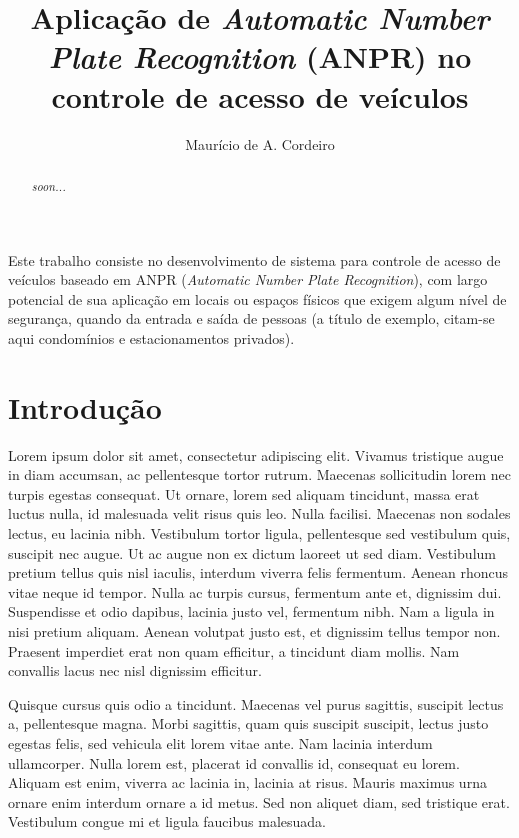 \documentclass[12pt]{article}
\title{Aplicação de \textit{Automatic Number Plate Recognition} (ANPR) no controle de acesso de veículos}
\author{Maurício de A. Cordeiro\inst{1} }
\begin{document}
 

\maketitle

\begin{abstract}
  \textit{soon...}
\end{abstract}
     
\begin{resumo} 
 Este trabalho consiste no desenvolvimento de sistema para controle de acesso de veículos baseado em ANPR (\textit{Automatic Number Plate Recognition}), com largo potencial de sua aplicação em locais ou espaços físicos que exigem algum nível de segurança, quando da entrada e saída de pessoas (a título de exemplo, citam-se aqui condomínios e estacionamentos privados). 
\end{resumo}

\section{Introdução}


Lorem ipsum dolor sit amet, consectetur adipiscing elit. Vivamus tristique augue in diam accumsan, ac pellentesque tortor rutrum. Maecenas sollicitudin lorem nec turpis egestas consequat. Ut ornare, lorem sed aliquam tincidunt, massa erat luctus nulla, id malesuada velit risus quis leo. Nulla facilisi. Maecenas non sodales lectus, eu lacinia nibh. Vestibulum tortor ligula, pellentesque sed vestibulum quis, suscipit nec augue. Ut ac augue non ex dictum laoreet ut sed diam. Vestibulum pretium tellus quis nisl iaculis, interdum viverra felis fermentum. Aenean rhoncus vitae neque id tempor. Nulla ac turpis cursus, fermentum ante et, dignissim dui. Suspendisse et odio dapibus, lacinia justo vel, fermentum nibh. Nam a ligula in nisi pretium aliquam. Aenean volutpat justo est, et dignissim tellus tempor non. Praesent imperdiet erat non quam efficitur, a tincidunt diam mollis. Nam convallis lacus nec nisl dignissim efficitur.

Quisque cursus quis odio a tincidunt. Maecenas vel purus sagittis, suscipit lectus a, pellentesque magna. Morbi sagittis, quam quis suscipit suscipit, lectus justo egestas felis, sed vehicula elit lorem vitae ante. Nam lacinia interdum ullamcorper. Nulla lorem est, placerat id convallis id, consequat eu lorem. Aliquam est enim, viverra ac lacinia in, lacinia at risus. Mauris maximus urna ornare enim interdum ornare a id metus. Sed non aliquet diam, sed tristique erat. Vestibulum congue mi et ligula faucibus malesuada.
\end{document}
